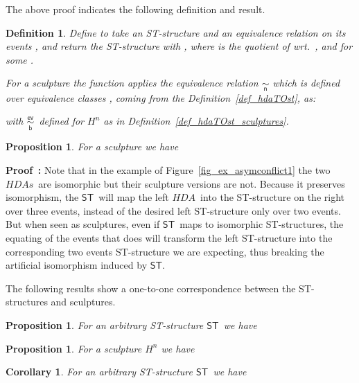 \documentclass[submission,copyright,creativecommons]{eptcs}
\newtheorem{proposition}[theorem]{Proposition}
\newtheorem{corollary}[theorem]{Corollary}
\newtheorem{definition}[theorem]{Definition}
\newenvironment{proof}[1][\!\!\,]{\vspace{1ex}\noindent\textbf{Proof #1: }}{\hfill\vspace{2ex}}
\newcommand{\cp}[1]{}
\newcommand\HDA{\ensuremath{\mathit{HDA}}}
\newcommand\HDAs{\ensuremath{\mathit{HDAs}}}
\newcommand\ST{\ensuremath{\mathsf{ST}}}
\newcommand\hintost{\ensuremath{\mathsf{ST}}}
\newcommand\sculpture[2]{\ensuremath{#1^{#2}}}
\newcommand\eventEquivHDAsculpture{\ensuremath{\overset{\mathsf{ev}}{\underset{\mathsf{b}}{\sim}}}}
\newcommand\eventEquivFromBulk[1]{\ensuremath{\underset{\mathsf{#1}}{\sim}}}
\begin{document}
The above proof indicates the following definition and result.

\begin{definition}
Define  to take an ST-structure  and an equivalence relation on its events , and return the ST-structure  with ,  where  is the quotient of  wrt.\ , and  for some .

For a sculpture  the function  applies the equivalence relation \eventEquivFromBulk{n} which is defined over equivalence classes , coming from the Definition~\ref{def_hdaTOst}, as: 

with \eventEquivHDAsculpture\ defined for \sculpture{H}{n} as in Definition~\ref{def_hdaTOst_sculptures}.
\end{definition}



\begin{proposition}\label{prop_eqcircst}
For a sculpture  we have

\end{proposition}

\begin{proof}
Note that in the example of Figure~\ref{fig_ex_asymconflict1} the two \HDAs\ are isomorphic but their sculpture versions are not. Because it preserves isomorphism, the \hintost\ will map the left \HDA\ into the ST-structure on the right over three events, instead of the desired left ST-structure only over two events. But when seen as sculptures, even if \hintost\ maps to isomorphic ST-structures, the equating of the events that  does will transform the left ST-structure into the corresponding two events ST-structure we are expecting, thus breaking the artificial isomorphism induced by \hintost.

\cp{Finish proof!!}
\end{proof}


The following results show a one-to-one correspondence between the ST-structures and sculptures.

\begin{proposition}\label{prop_stSculptst}
For an arbitrary ST-structure \ST\ we have

\end{proposition}



\begin{proposition}
For a sculpture \sculpture{H}{n} we have

\end{proposition}

\begin{corollary}
For an arbitrary ST-structure \ST\ we have

\end{corollary}
\end{document}
